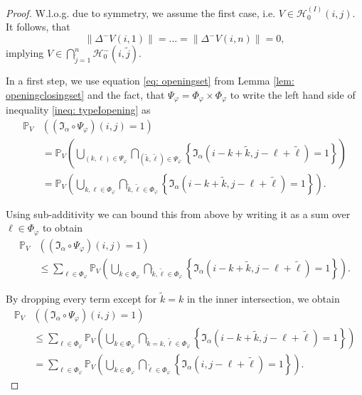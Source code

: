 \documentclass[a4paper,12pt]{article}
\newcommand{\norm}[1]{\lVert#1\rVert}
\theoremstyle{plain}
\theoremstyle{definition}
\numberwithin{equation}{section}
\begin{document}
\begin{proof}
	W.l.o.g. due to symmetry, we assume the first case, i.e. $V \in \mathcal{H}_0^{(I)}(i, j)$. It follows, that
	\begin{equation*}
		\norm{\Delta^- V(i, 1)} = \ldots = \norm{\Delta^- V(i, n)} = 0,
	\end{equation*}
	implying $V \in \bigcap_{\tilde{j} = 1}^n \mathcal{H}_0^-(i, \tilde{j})$.
	
	In a first step, we use equation \eqref{eq: openingset} from Lemma \ref{lem: openingclosingset} and the fact, that $\Psi_\varphi = \Phi_\varphi \times \Phi_\varphi$ to write the left hand side of inequality \eqref{ineq: typeIopening} as
	\begin{align*}
		\mathbb{P}_V&\left( (\mathfrak{I}_\alpha \circ \Psi_\varphi)(i, j) = 1 \right) \\
		&= \mathbb{P}_V\left( \bigcup_{(k, \ell) \in \Psi_\varphi} \bigcap_{(\tilde{k}, \tilde{\ell}) \in \Psi_\varphi} \left\{ \mathfrak{I}_\alpha(i - k + \tilde{k}, j - \ell + \tilde{\ell}) = 1 \right\} \right) \\
		&= \mathbb{P}_V\left( \bigcup_{k, \ell \in \Phi_\varphi} \bigcap_{\tilde{k}, \tilde{\ell} \in \Phi_\varphi} \left\{ \mathfrak{I}_\alpha(i - k + \tilde{k}, j - \ell + \tilde{\ell}) = 1 \right\} \right).
	\end{align*}
	
	Using sub-additivity we can bound this from above by writing it as a sum over $\ell \in \Phi_\varphi$ to obtain
	\begin{align*}
		\mathbb{P}_V&\left( (\mathfrak{I}_\alpha \circ \Psi_\varphi)(i, j) = 1 \right) \\
		&\leq \sum_{\ell \in \Phi_\varphi} \mathbb{P}_V\left( \bigcup_{k \in \Phi_\varphi} \bigcap_{\tilde{k}, \tilde{\ell} \in \Phi_\varphi} \left\{ \mathfrak{I}_\alpha(i - k + \tilde{k}, j - \ell + \tilde{\ell}) = 1 \right\} \right).
	\end{align*}
	
	By dropping every term except for $\tilde{k} = k$ in the inner intersection, we obtain
	\begin{align*}
		\mathbb{P}_V&\left( (\mathfrak{I}_\alpha \circ \Psi_\varphi)(i, j) = 1 \right) \\
		&\leq \sum_{\ell \in \Phi_\varphi} \mathbb{P}_V\left( \bigcup_{k \in \Phi_\varphi} \bigcap_{\tilde{k} = k, \tilde{\ell} \in \Phi_\varphi} \left\{ \mathfrak{I}_\alpha(i - k + \tilde{k}, j - \ell + \tilde{\ell}) = 1 \right\} \right) \\
		&= \sum_{\ell \in \Phi_\varphi} \mathbb{P}_V\left( \bigcup_{k \in \Phi_\varphi} \bigcap_{\tilde{\ell} \in \Phi_\varphi} \left\{ \mathfrak{I}_\alpha(i, j - \ell + \tilde{\ell}) = 1 \right\} \right).
	\end{align*}
	

\end{proof}
\end{document}
